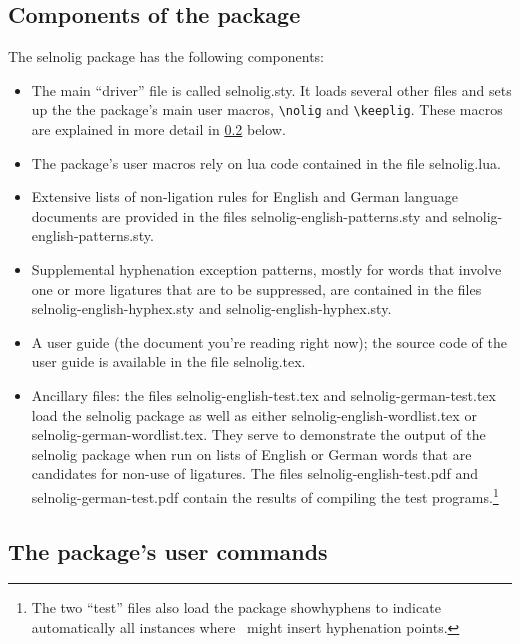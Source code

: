 \documentclass[11pt]{article}
\newcommand{\pkg}[1]{\textsf{#1}}
\newcommand{\cmmd}[1]{\texttt{\textbackslash #1}}
\begin{document}
\subsection{Components of the package}

The \pkg{selnolig} package has the following components:
\begin{itemize}
\item The main \enquote{driver} file is called \pkg{selnolig.sty}. It loads several other files and sets up the the package's main user macros, \cmmd{nolig} and \cmmd{keeplig}. These macros are explained in more detail in \cref{sec:syntax} below.
\item The package's user macros rely on lua code contained in the file \pkg{selnolig.lua}. 
\item Extensive lists of non-ligation rules for English and German language documents are provided in the files \pkg{selnolig-english-patterns.sty} and \pkg{selnolig-english-patterns.sty}. 
\item Supplemental hyphenation exception patterns, mostly for words that involve one or more ligatures that are to be suppressed, are contained in the files \pkg{selnolig-english-hyphex.sty} and \pkg{selnolig-english-hyphex.sty}.
\item A user guide (the document you're reading right now); the source code of the user guide is available in the file \pkg{selnolig.tex}. 

\item Ancillary files: the files \pkg{selnolig-english-test.tex} and \pkg{selnolig-german-test.tex} load the \pkg{selnolig} package as well as either \pkg{selnolig-english-wordlist.tex} or \pkg{selnolig-german-wordlist.tex}. They serve to demonstrate the output of the \pkg{selnolig} package when run on lists of English or German words that are candidates for non-use of ligatures. The files \pkg{selnolig-english-test.pdf} and \pkg{selnolig-german-test.pdf} contain the results of compiling the test programs.\footnote{The two \enquote{test} files also load the package \pkg{showhyphens} to indicate automatically all instances where \LuaLaTeX\ might insert hyphenation points.}

\end{itemize}


\subsection{The package's user commands} \label{sec:syntax}
\end{document}
